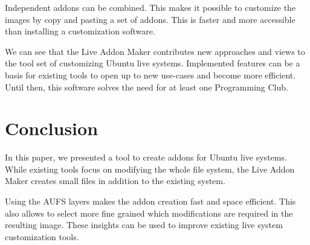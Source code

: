 \documentclass[english]{lni}
\begin{document}
Independent addons can be combined. %
This makes it possible to customize the images by copy and pasting a set of addons.
This is faster and more accessible than installing a customization software.

We can see that the Live Addon Maker contributes new approaches and views to the  tool set of customizing Ubuntu live systems.
Implemented features can be a basis for existing tools to open up to new use-cases and become more efficient. %
Until then, this software solves the need for at least one Programming Club.

\section{Conclusion}

In this paper, we presented a tool to create addons for Ubuntu live systems.
While existing tools focus on modifying the whole file system, the Live Addon Maker creates small files in addition to the existing system.

Using the AUFS layers makes the addon creation fast and space efficient.
This also allows to select more fine grained which modifications are required in the resulting image.
These insights can be used to improve existing live system customization tools.



\end{document}
